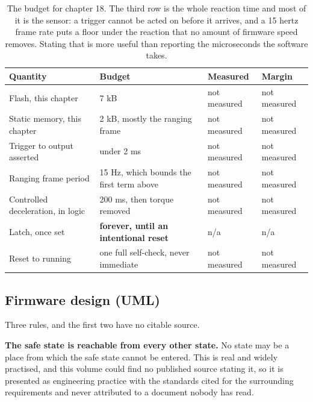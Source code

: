 \begin{table}[H]\centering\small
\begin{tabular}{p{44mm}p{28mm}p{28mm}p{30mm}}
\toprule
Quantity & Budget & Measured & Margin \\
\midrule
Flash, this chapter & 7 kB & not measured & not measured \\
Static memory, this chapter & 2 kB, mostly the ranging frame & not measured & not measured \\
Trigger to output asserted & under 2 ms & not measured & not measured \\
Ranging frame period & 15 Hz, which bounds the first term above & not measured & not measured \\
Controlled deceleration, in logic & 200 ms, then torque removed & not measured & not measured \\
Latch, once set & \textbf{forever, until an intentional reset} & n/a & n/a \\
Reset to running & one full self-check, never immediate & not measured & not measured \\
\bottomrule
\end{tabular}
\caption{The budget for chapter 18. The third row is the whole reaction time and most of it is the sensor: a trigger cannot be acted on before it arrives, and a 15 hertz frame rate puts a floor under the reaction that no amount of firmware speed removes. Stating that is more useful than reporting the microseconds the software takes.}
\end{table}

\subsection*{Firmware design (UML)}


Three rules, and the first two have no citable source.

\textbf{The safe state is reachable from every other state.} No state may be a
place from which the safe state cannot be entered. This is real and widely
practised, and this volume could find no published source stating it, so it is
presented as engineering practice with the standards cited for the surrounding
requirements and never attributed to a document nobody has read.

